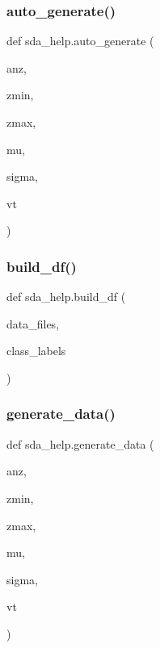 \subsubsection{\texorpdfstring{auto\+\_\+generate()}{auto\_generate()}}
{\footnotesize\ttfamily def sda\+\_\+help.\+auto\+\_\+generate (\begin{DoxyParamCaption}\item[{}]{anz,  }\item[{}]{zmin,  }\item[{}]{zmax,  }\item[{}]{mu,  }\item[{}]{sigma,  }\item[{}]{vt }\end{DoxyParamCaption})}

\mbox{\label{namespacesda__help_a0e84ec3ca4b84fa2226cdc2b9453904f}} 
\subsubsection{\texorpdfstring{build\+\_\+df()}{build\_df()}}
{\footnotesize\ttfamily def sda\+\_\+help.\+build\+\_\+df (\begin{DoxyParamCaption}\item[{}]{data\+\_\+files,  }\item[{}]{class\+\_\+labels }\end{DoxyParamCaption})}

\mbox{\label{namespacesda__help_a0fd7c56bbe7922702e48e68e8940d875}} 
\subsubsection{\texorpdfstring{generate\+\_\+data()}{generate\_data()}}
{\footnotesize\ttfamily def sda\+\_\+help.\+generate\+\_\+data (\begin{DoxyParamCaption}\item[{}]{anz,  }\item[{}]{zmin,  }\item[{}]{zmax,  }\item[{}]{mu,  }\item[{}]{sigma,  }\item[{}]{vt }\end{DoxyParamCaption})}

